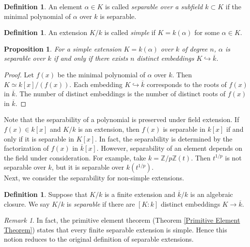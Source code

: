 \documentclass[12pt]{report}
\theoremstyle{plain}
\newtheorem{proposition}[theorem]{Proposition}
\theoremstyle{remark}
\newtheorem*{remark}{Remark}
\theoremstyle{definition}
\newtheorem{definition}[theorem]{Definition}
\newcommand{\Z}{\mathbb{Z}}
\begin{document}
\begin{definition}
    An element $\alpha\in K$ is called \emph{separable over a subfield $k\subset K$} if the minimal polynomial of $\alpha$ over $k$ is separable.
\end{definition}

\begin{definition}
    An extension $K/k$ is called \emph{simple} if $K=k(\alpha)$ for some $\alpha\in K$.
\end{definition}

\begin{proposition}
    For a simple extension $K=k(\alpha)$ over $k$ of degree $n$, $\alpha$ is separable over $k$ if and only if there exists $n$ distinct embeddings $K\hookrightarrow\overline{k}$.
\end{proposition}
\begin{proof}
    Let $f(x)$ be the minimal polynomial of $\alpha$ over $k$. Then $K\simeq k[x]/(f(x))$. Each embedding $K\hookrightarrow\overline{k}$ corresponds to the roots of $f(x)$ in $\overline{k}$. The number of distinct embeddings is the number of distinct roots of $f(x)$ in $\overline{k}$.
\end{proof}

Note that the separability of a polynomial is preserved under field extension. If $f(x)\in k[x]$ and $K/k$ is an extension, then $f(x)$ is separable in $k[x]$ if and only if it is separable in $K[x]$. In fact, the separability is determined by the factorization of $f(x)$ in $\overline{k}[x]$. However, separability of an element depends on the field under consideration. For example, take $k=\Z/p\Z(t)$. Then $t^{1/p}$ is not separable over $k$, but it is separable over $k(t^{1/p})$.\\

Next, we consider the separability for non-simple extensions.

\begin{definition}
    Suppose that $K/k$ is a finite extension and $\overline{k}/k$ is an algebraic closure. We say $K/k$ is \emph{separable} if there are $[K:k]$ distinct embeddings $K\rightarrow \overline{k}$.
\end{definition}
\begin{remark}
    In fact, the primitive element theorem (Theorem \ref{Primitive Element Theorem}) states that every finite separable extension is simple. Hence this notion reduces to the original definition of separable extensions.
\end{remark}
\end{document}
